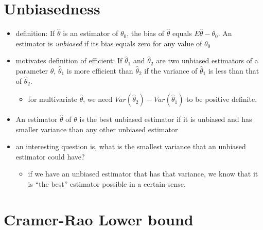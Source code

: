 \section{Unbiasedness}
\label{sec-2}

\begin{itemize}
\item definition: If $\hat \theta$ is an estimator of $\theta_0$,
       the bias of $\hat \theta$ equals $E \hat \theta - \theta_0$.
       An estimator is \emph{unbiased} if its bias equals zero for any
       value of $\theta_0$
\item motivates definition of efficient: If $\hat \theta_1$ and $\hat
       \theta_2$ are two unbiased estimators of a parameter $\theta$,
       $\hat \theta_1$ is more efficient than $\hat \theta_2$ if the
       variance of $\hat \theta_1$ is less than that of $\hat \theta_2$.
\begin{itemize}
\item for multivariate $\hat\theta$, we need $Var(\hat\theta_2) -
         Var(\hat\theta_1)$ to be positive definite.
\end{itemize}
\item An estimator $\hat\theta$ of $\theta$ is the best unbiased
       estimator if it is unbiased and has smaller variance than any
       other unbiased estimator
\item an interesting question is, what is the smallest variance that
       an unbiased estimator could have?
\begin{itemize}
\item if we have an unbiased estimator that has that variance, we
         know that it is ``the best'' estimator possible in a certain sense.
\end{itemize}
\end{itemize}
\section{Cramer-Rao Lower bound}
\label{sec-3}

